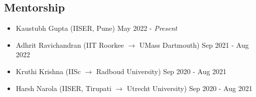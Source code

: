 \documentclass[11pt, margin, centered, letterpaper]{res}
\begin{document}
\begin{resume}


\section{Mentorship}
\begin{itemize}[leftmargin=*]
    \item Kaustubh Gupta (IISER, Pune) \hfill May 2022 - \textit{Present}
    \item Adhrit Ravichandran (IIT Roorkee $\rightarrow$ UMass Dartmouth) \hfill Sep 2021 - Aug 2022
	\item Kruthi Krishna (IISc $ \rightarrow $ Radboud University) \hfill Sep 2020 - Aug 2021
	\item Harsh Narola (IISER, Tirupati $ \rightarrow $ Utrecht University) \hfill Sep 2020 - Aug 2021
\end{itemize}


\end{resume}
\end{document}
